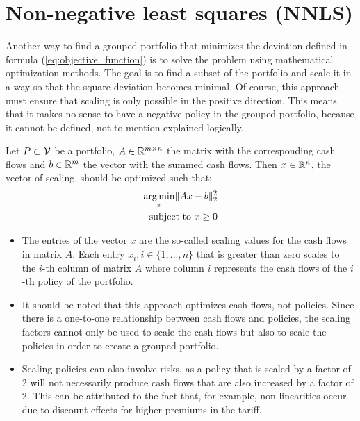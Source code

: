 

\chapter{Non-negative least squares (NNLS)}
\label{cha:NNLS}

Another way to find a grouped portfolio that minimizes the deviation defined in formula (\ref{eq:objective_function}) is to solve the problem using mathematical optimization methods. The goal is to find a subset of the portfolio and scale it in a way so that the square deviation becomes minimal. Of course, this approach must ensure that scaling is only possible in the positive direction. This means that it makes no sense to have a negative policy in the grouped portfolio, because it cannot be defined, not to mention explained logically. 

\begin{definition}\label{def:NNLS}
	Let $P \subset \mathcal{V}$ be a portfolio, \linebreak $A \in \mathbb{R}^{m \times n}$ the matrix with the corresponding cash flows and $b \in \mathbb{R}^m$ the vector with the summed cash flows. Then $x \in \mathbb{R}^n$, the vector of scaling, should be optimized such that:  
	\begin{equation}\label{eq:NNLS}
		\begin{aligned}
			\operatorname*{arg\,min}_x \lVert Ax -b \rVert_2^2 \\
			\text{subject to } x \geq 0
		\end{aligned}
	\end{equation}
\end{definition}

\begin{remark}
	\leavevmode %
	\makeatletter
	\@nobreaktrue
	\makeatother
	\begin{itemize}
		\item 	The entries of the vector $x$ are the so-called scaling values for the cash flows in matrix $A$. Each entry $x_i, i \in \{1,...,n\}$ that is greater than zero scales to the $i$-th column of matrix $A$ where column $i$ represents the cash flows of the $i$-th policy of the portfolio.
		\item 	It should be noted that this approach optimizes cash flows, not policies. Since there is a one-to-one relationship between cash flows and policies, the scaling factors cannot only be used to scale the cash flows but also to scale the policies in order to create a grouped portfolio. 
		\item 	Scaling policies can also involve risks, as a policy that is scaled by a factor of 2 will not necessarily produce cash flows that are also increased by a factor of 2. This can be attributed to the fact that, for example, non-linearities occur due to discount effects for higher premiums in the tariff.
	\end{itemize}
\end{remark}

